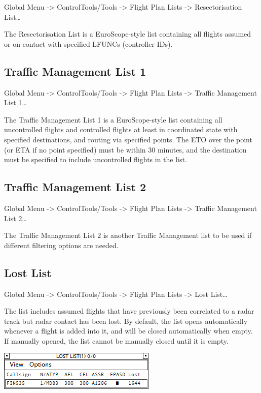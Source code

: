 \documentclass[11pt,a4paper]{memoir}
\begin{document}
Global Menu -> ControlTools/Tools -> Flight Plan Lists -> Resectorisation List…

The Resectorisation List is a EuroScope-style list containing all flights assumed or on-contact with specified LFUNCs (controller IDs).

\subsection{Traffic Management List 1}
\label{list:tml1}

Global Menu -> ControlTools/Tools -> Flight Plan Lists -> Traffic Management List 1…

The Traffic Management List 1 is a EuroScope-style list containing all uncontrolled flights and controlled flights at least in coordinated state with specified destinations, and routing via specified points. The ETO over the point (or ETA if no point specified) must be within 30 minutes, and the destination must be specified to include uncontrolled flights in the list.

\subsection{Traffic Management List 2}
\label{list:tml2}

Global Menu -> ControlTools/Tools -> Flight Plan Lists -> Traffic Management List 2…

The Traffic Management List 2 is another Traffic Management list to be used if different filtering options are needed.

\subsection{Lost List}
\label{list:lost}

Global Menu -> ControlTools/Tools -> Flight Plan Lists -> Lost List…

The list includes assumed flights that have previously been correlated to a radar track but radar contact has been lost. By default, the list opens automatically whenever a flight is added into it, and will be closed automatically when empty. If manually opened, the list cannot be manually closed until it is empty.

\includegraphics{img/llist.png}
\end{document}
